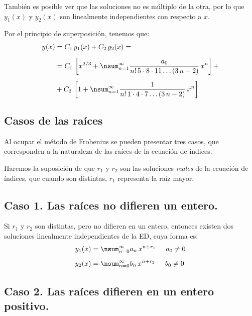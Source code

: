 \par
También es posible ver que las soluciones no es múltiplo de la otra, por lo que $y_{1}(x)$ y $y_{2}(x)$ son linealmente independientes con respecto a $x$.
\par
Por el principio de superposición, tenemos que:
\begin{align*}
y (x) &= C_{1} \, y_{1} (x) + C_{2} \, y_{2} (x) = \\[0.5em]
&= C_{1} \, \left[ x^{2/3} + \nsum_{n=1}^{\infty} \dfrac{a_{0}}{n! \, 5 \cdot 8 \cdot 11 \ldots (3\, n + 2)} \, x^{n} \right] + \\[0.5em]
&+ C_{2} \, \left[ 1 + \nsum_{n=1}^{\infty} \dfrac{1}{n! \, 1 \cdot 4 \cdot 7 \ldots (3\, n - 2)} \, x^{n} \right]
\end{align*}

\subsection{Casos de las raíces}

Al ocupar el método de Frobenius se pueden presentar tres casos, que corresponden a la naturaleza de las raíces de la ecuación de índices.
\par
Haremos la suposición de que $r_{1}$ y $r_{2}$ son las soluciones \emph{reales} de la ecuación de índices, que cuando son distintas, $r_{1}$ representa la raíz mayor.

\subsection*{Caso 1. Las raíces no difieren un entero.}

Si $r_{1}$ y $r_{2}$ son distintas, pero no difieren  en un entero, entonces existen dos soluciones linealmente independientes de la ED, cuya forma es:
\begin{subequations}
\begin{align}
y_{1}(x) &= \nsum_{n=0}^{\infty} a_{n} \, x^{n+r_{1}} \hspace{0.5cm} a_{0} \neq 0 \label{eq:ecuacion_14a} \\[0.5em]
y_{2}(x) &= \nsum_{n=0}^{\infty} b_{n} \, x^{n+r_{2}} \hspace{0.5cm} b_{0} \neq 0 \label{eq:ecuacion_14b}
\end{align}
\end{subequations}

\subsection*{Caso 2. Las raíces difieren en un entero positivo.}

